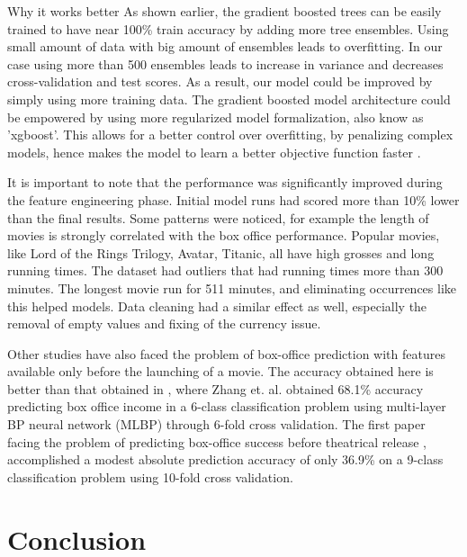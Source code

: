 Why it works better
As shown earlier, the gradient boosted trees can be easily trained to have near 100\% train accuracy by adding more tree ensembles. Using small amount of data with big amount of ensembles leads to overfitting. In our case using more than 500 ensembles leads to increase in variance and decreases cross-validation and  test scores. As a result, our model could be improved by simply using more training data. The gradient boosted model architecture could be empowered by using more regularized model formalization, also know as 'xgboost'. This allows for a better control over overfitting, by penalizing complex models, hence makes the model to learn a better objective function faster \cite{chen2015}.  

It is important to note that the performance was significantly improved during the feature engineering phase. Initial model runs had scored more than 10\% lower than the final results. Some patterns were noticed, for example the length of movies is strongly correlated with the box office performance. Popular movies, like Lord of the Rings Trilogy, Avatar, Titanic, all have high grosses and long running times. The dataset had outliers that had running times more than 300 minutes. The longest movie run for 511 minutes,  and eliminating occurrences like this helped models. Data cleaning had a similar effect as well, especially the removal of empty values and fixing of the currency issue.

Other studies have also faced the problem of box-office prediction with features available only before the launching of a movie. The accuracy obtained here is better than that obtained in \cite{zhang2009forecasting}, where Zhang et. al. obtained 68.1\% accuracy predicting box office income in a 6-class classification problem using multi-layer BP neural network (MLBP) through 6-fold cross validation. The first paper facing the problem of predicting box-office success before theatrical release \cite{sharda2006predicting}, accomplished a modest absolute prediction accuracy of only 36.9\% on a 9-class classification problem using 10-fold cross validation. 



\section{Conclusion}